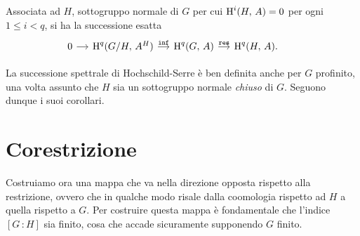 \begin{corollary}\label{boo2}
	Associata ad $ H $, sottogruppo normale di $ G $ per cui $ \operatorname{H}^i(H, \, A ) = 0 $ per ogni $ 1 \leq i < q $, si ha la successione esatta
	\[\begin{tikzcd}[column sep = small]
	0 \rar & \HH^q(G/H, \, A^H) \rar["\Inf"]
	& \HH^q(G, \, A) \rar["\Res"]
	& \HH^q(H, \, A).
	\end{tikzcd} \qquad  \]
\end{corollary}

\begin{profinite}
	La successione spettrale di Hochschild-Serre è ben definita anche per $ G $ profinito, una volta assunto che $ H $ sia un sottogruppo normale \emph{chiuso} di $ G $. Seguono dunque i suoi corollari. \todo[ah si? perche?]
\end{profinite}


\section{Corestrizione}
Costruiamo ora una mappa che va nella direzione opposta rispetto alla restrizione, ovvero che in qualche modo risale dalla coomologia rispetto ad $ H $ a quella rispetto a $ G $. Per costruire questa mappa è fondamentale che l'indice $ [G \, \colon H] $ sia finito, cosa che accade sicuramente supponendo $ G $ finito.

